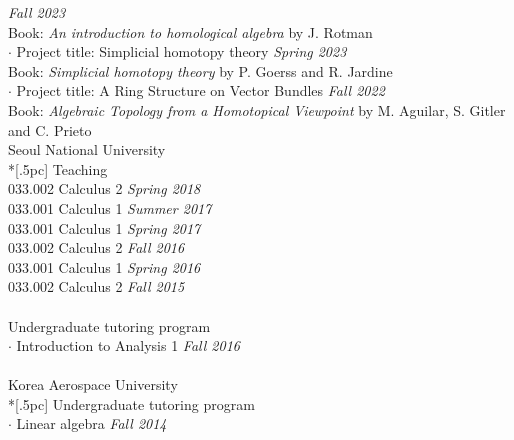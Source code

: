 \documentclass{article}
\begin{document}
 \hfill {\it Fall 2023 \/}\\
\hspace*{1em} Book: {\it An introduction to homological algebra} by J. Rotman\\
$\cdot$ Project title: Simplicial homotopy theory \hfill {\it Spring 2023 \/}\\
\hspace*{1em} Book: {\it Simplicial homotopy theory} by P. Goerss and R. Jardine\\
$\cdot$ Project title: A Ring Structure on Vector Bundles \hfill {\it Fall 2022 \/}\\
\hspace*{1em} Book: {\it Algebraic Topology from a Homotopical Viewpoint } by  M. Aguilar, S. Gitler and C. Prieto\\

{ \large Seoul National University} \\*[.5pc]
{ Teaching} \\
033.002 Calculus 2  \hfill {\it Spring 2018\/}\\
033.001 Calculus 1  \hfill {\it Summer 2017\/}\\
033.001 Calculus 1  \hfill {\it Spring 2017\/}\\
033.002 Calculus 2  \hfill {\it Fall 2016  \/}\\
033.001 Calculus 1  \hfill {\it Spring 2016\/}\\
033.002 Calculus 2  \hfill {\it Fall 2015 \/}\\ \\
{ Undergraduate tutoring program} \\
$\cdot$ Introduction to Analysis 1  \hfill {\it Fall 2016 \/}\\
\\
{ \large Korea Aerospace University} \\*[.5pc]
{ Undergraduate tutoring program }\\
$\cdot$ Linear algebra \hfill {\it Fall 2014 \/}\\
\\ 
\end{document}
